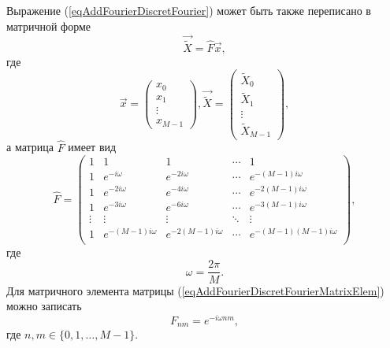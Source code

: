 Выражение (\ref{eqAddFourierDiscretFourier}) может быть также
переписано в матричной форме
\begin{equation}
\vec{\tilde{X}} = \hat{F} \vec{x},
\nonumber
\end{equation}
где
\begin{equation}
\vec{x} = 
\left(
\begin{array}{c}
x_0 \\
x_1 \\
\vdots \\
x_{M-1}
\end{array}
\right)
,
\vec{\tilde{X}} = 
\left(
\begin{array}{c}
\tilde{X}_0 \\
\tilde{X}_1 \\
\vdots \\
\tilde{X}_{M-1}
\end{array}
\right)
,
\nonumber
\end{equation}
а матрица $\hat{F}$ имеет вид
\begin{equation}
\hat{F} = 
\begin{pmatrix}
1 & 1 & 1 & \cdots & 1 \\
1 & e^{-i \omega} & e^{-2 i \omega} & \cdots & 
e^{-\left( M - 1 \right) i \omega} \\
1 & e^{-2 i \omega} & e^{-4 i \omega} & \cdots & 
e^{-2 \left( M - 1 \right) i \omega} \\
1 & e^{-3 i \omega} & e^{-6 i \omega} & \cdots & 
e^{-3 \left( M - 1 \right) i \omega} \\
\vdots & \vdots & \vdots & \ddots & \vdots \\
1 & e^{-\left( M - 1 \right) i \omega} & e^{-2\left( M - 1 \right) i \omega} & \cdots & 
e^{- \left( M - 1 \right)\left( M - 1 \right) i \omega} \\
\end{pmatrix}
,
\label{eqAddFourierDiscretFourierMatrixElem}
\end{equation}
где
\[
\omega = \frac{2 \pi}{M}.
\]
Для матричного элемента матрицы
(\ref{eqAddFourierDiscretFourierMatrixElem}) можно записать
\begin{equation}
F_{n m} = e^{-i \omega n m},
\label{eqAddFourierDiscretFourierMatrixElem2}
\end{equation}
где $n, m \in \{ 0, 1, \dots, M - 1\}$.
